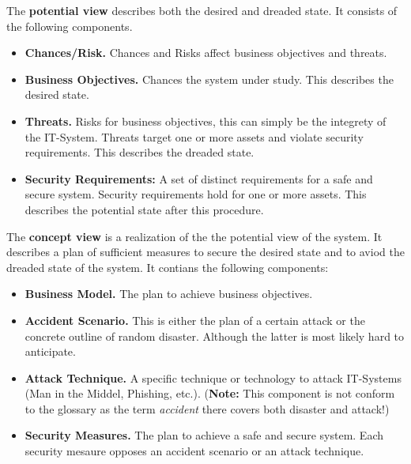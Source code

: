 The \textbf{potential view} describes both the desired and dreaded state.
It consists of the following components.
\begin{itemize}
\item \textbf{Chances/Risk.}
Chances and Risks affect business objectives and threats.

\item \textbf{Business Objectives.}
Chances the system under study.
This describes the desired state.

\item \textbf{Threats.}
Risks for business objectives, this can simply be the integrety of the IT-System.
Threats target one or more assets and violate security requirements.
This describes the dreaded state.

\item
\textbf{Security Requirements:} A set of distinct requirements for a safe and secure system.
Security requirements hold for one or more assets.
This describes the potential state after this procedure.
\end{itemize}

The \textbf{concept view} is a realization of the the potential view of the system.
It describes a plan of sufficient measures to secure the desired state and to aviod the dreaded state of the system.
It contians the following components:
\begin{itemize}
\item \textbf{Business Model.}
The plan to achieve business objectives.

\item \textbf{Accident Scenario.}
This is either the plan of a certain attack or the concrete outline of random disaster.
Although the latter is most likely hard to anticipate.

\item \textbf{Attack Technique.}
A specific technique or technology to attack IT-Systems (Man in the Middel, Phishing, etc.).
(\textbf{Note:} This component is not conform to the glossary as the term \emph{accident} there covers both disaster and attack!)

\item \textbf{Security Measures.}
The plan to achieve a safe and secure system.
Each security mesaure opposes an accident scenario or an attack technique.

\end{itemize}


